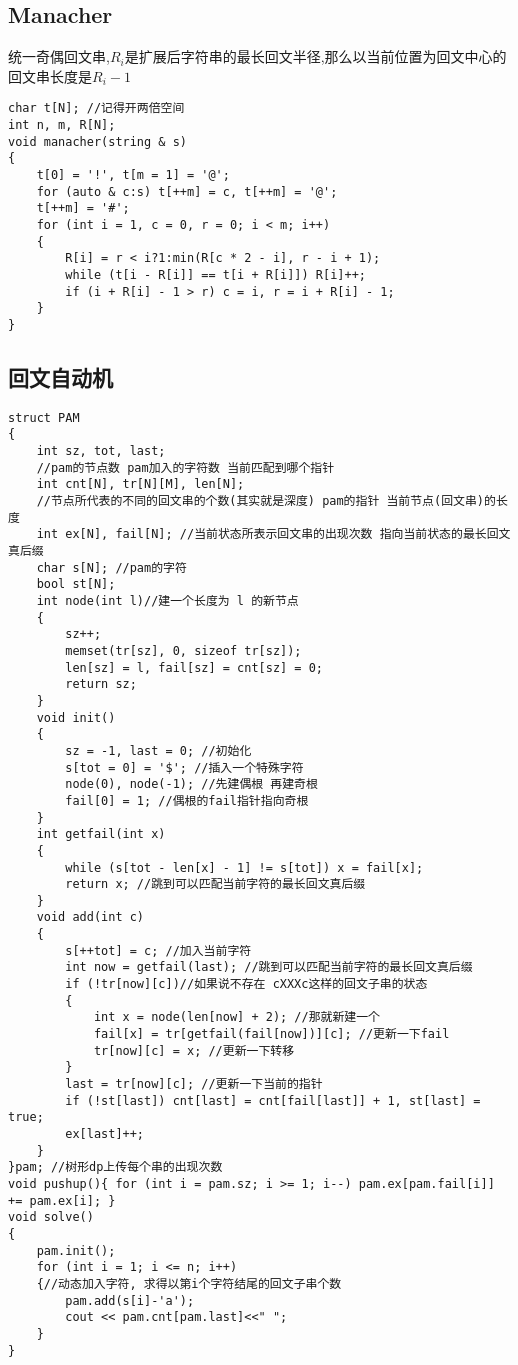 \documentclass[a4paper, fontset=none]{ctexart}
\begin{document}
\subsection{Manacher}

统一奇偶回文串,$R_i$是扩展后字符串的最长回文半径,那么以当前位置为回文中心的回文串长度是$R_i-1$

\begin{verbatim}
char t[N]; //记得开两倍空间
int n, m, R[N];
void manacher(string & s)
{
    t[0] = '!', t[m = 1] = '@';
    for (auto & c:s) t[++m] = c, t[++m] = '@';
    t[++m] = '#';
    for (int i = 1, c = 0, r = 0; i < m; i++)
    {
        R[i] = r < i?1:min(R[c * 2 - i], r - i + 1);
        while (t[i - R[i]] == t[i + R[i]]) R[i]++;
        if (i + R[i] - 1 > r) c = i, r = i + R[i] - 1;
    }
}
\end{verbatim}
\subsection{回文自动机}

\begin{verbatim}
struct PAM
{
    int sz, tot, last;
    //pam的节点数 pam加入的字符数 当前匹配到哪个指针
    int cnt[N], tr[N][M], len[N];
    //节点所代表的不同的回文串的个数(其实就是深度) pam的指针 当前节点(回文串)的长度
    int ex[N], fail[N]; //当前状态所表示回文串的出现次数 指向当前状态的最长回文真后缀
    char s[N]; //pam的字符
    bool st[N];
    int node(int l)//建一个长度为 l 的新节点
    {
        sz++;
        memset(tr[sz], 0, sizeof tr[sz]);
        len[sz] = l, fail[sz] = cnt[sz] = 0;
        return sz;
    }
    void init()
    {
        sz = -1, last = 0; //初始化
        s[tot = 0] = '$'; //插入一个特殊字符
        node(0), node(-1); //先建偶根 再建奇根
        fail[0] = 1; //偶根的fail指针指向奇根
    }
    int getfail(int x)
    {
        while (s[tot - len[x] - 1] != s[tot]) x = fail[x];
        return x; //跳到可以匹配当前字符的最长回文真后缀
    }
    void add(int c)
    {
        s[++tot] = c; //加入当前字符
        int now = getfail(last); //跳到可以匹配当前字符的最长回文真后缀
        if (!tr[now][c])//如果说不存在 cXXXc这样的回文子串的状态
        {
            int x = node(len[now] + 2); //那就新建一个
            fail[x] = tr[getfail(fail[now])][c]; //更新一下fail
            tr[now][c] = x; //更新一下转移
        }
        last = tr[now][c]; //更新一下当前的指针
        if (!st[last]) cnt[last] = cnt[fail[last]] + 1, st[last] = true;
        ex[last]++;
    }
}pam; //树形dp上传每个串的出现次数
void pushup(){ for (int i = pam.sz; i >= 1; i--) pam.ex[pam.fail[i]] += pam.ex[i]; }
void solve()
{
    pam.init();
    for (int i = 1; i <= n; i++)
    {//动态加入字符, 求得以第i个字符结尾的回文子串个数
        pam.add(s[i]-'a');
        cout << pam.cnt[pam.last]<<" ";
    }
}
\end{verbatim}
\end{document}
